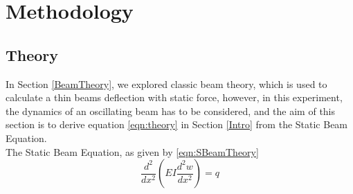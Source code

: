 \documentclass[a4paper,12pt]{article}
\begin{document}
\section{Methodology} \label{Methodology}%

    \subsection{Theory}\label{Theory}%
    In Section \ref{BeamTheory}, we explored classic beam theory, which is used to calculate a thin beams deflection with static force, however, in this experiment, the dynamics of an oscillating beam has to be considered, and the aim of this section is to derive equation \eqref{eqn:theory} in Section \ref{Intro} from the Static Beam Equation.\\
    The Static Beam Equation, as given by \eqref{eqn:SBeamTheory}
    \begin{equation}\label{eqn:SBeamTheory}
     \frac{d^{2}}{dx^{2}}(EI\frac{d^{2}w}{dx^{2}})=q
    \end{equation}
\end{document}
